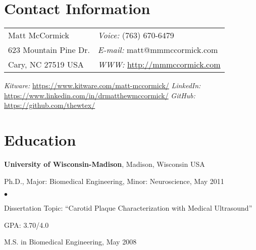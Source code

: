 \documentclass[margin,line]{res}
\newenvironment{list1}{
  \begin{list}{\ding{113}}{%
      \setlength{\itemsep}{0in}
      \setlength{\parsep}{0in} \setlength{\parskip}{0in}
      \setlength{\topsep}{0in} \setlength{\partopsep}{0in}
      \setlength{\leftmargin}{0.17in}}}{\end{list}}
\newenvironment{list2}{
  \begin{list}{$\bullet$}{%
      \setlength{\itemsep}{0in}
      \setlength{\parsep}{0in} \setlength{\parskip}{0in}
      \setlength{\topsep}{0in} \setlength{\partopsep}{0in}
      \setlength{\leftmargin}{0.2in}}}{\end{list}}
\begin{document}

\begin{resume}
\section{\sc Contact Information}
\vspace{.05in}
\begin{tabular}{@{}p{3in}p{4in}}
Matt McCormick                                          & {\it Voice:}  (763) 670-6479 \\
623 Mountain Pine Dr. & {\it E-mail:}  matt@mmmccormick.com \\
Cary, NC 27519 USA & {\it WWW:} \url{http://mmmccormick.com} \\
\end{tabular}

{\it Kitware:} \url{https://www.kitware.com/matt-mccormick/} \newline
{\it LinkedIn:} \url{https://www.linkedin.com/in/drmatthewmccormick/} \newline
{\it GitHub:} \url{https://github.com/thewtex/} \newline



\section{\sc Education}
{\bf University of Wisconsin-Madison}, Madison, Wisconsin USA \\
\vspace*{-.1in}
\begin{list1}
\item[] Ph.D., Major: Biomedical Engineering, Minor: Neuroscience, May 2011
\begin{list2}
\vspace*{.05in}
\item Dissertation Topic:  ``Carotid Plaque Characterization with Medical
Ultrasound''
\item GPA: 3.70/4.0
\end{list2}
\vspace*{.05in}
\item[] M.S. in Biomedical Engineering, May 2008
\end{list1}


\end{resume}
\end{document}
